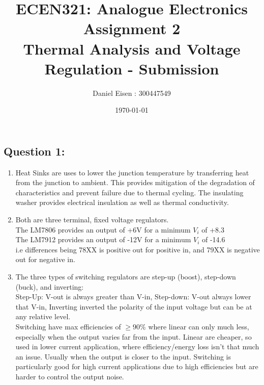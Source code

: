 \documentclass[11pt]{article}
\title{ECEN321: Analogue Electronics \\ Assignment 2 \\ Thermal Analysis and Voltage Regulation - Submission}
\author{Daniel Eisen : 300447549}
\date{\today}
\begin{document}
\begin{preview}

\maketitle
\section*{Question 1:}
\begin{enumerate}[label=\alph*)]
          \item Heat Sinks are uses to lower the junction temperature by transferring heat from the junction to ambient. This provides mitigation of the degradation of characteristics and prevent failure due to thermal cycling. The insulating washer provides electrical insulation as well as thermal conductivity.
          \item Both are three terminal, fixed voltage regulators. \\
          The LM7806 provides an output of +6V for a minimum $V_i$ of +8.3\\
          The LM7912 provides an output of -12V for a minimum $V_i$ of -14.6\\
          i.e differences being 78XX is positive out for positive in, and 79XX is negative out for negative in.
          \item The three types of switching regulators are step-up (boost), step-down (buck), and inverting:
          \\ Step-Up: V-out is always greater than V-in, Step-down: V-out always lower that V-in, Inverting inverted the polarity of the input voltage but can be at any relative level. \\ Switching have max efficiencies of $\ge90\%$ where linear can only much less, especially when the output varies far from the input. Linear are cheaper, so used in lower current application, where efficiency/energy loss isn't that much an issue. Usually when the output is closer to the input. Switching is particularly good for high current applications due to high efficiencies but are harder to control the output noise.

\end{enumerate}
\end{preview}
\end{document}
